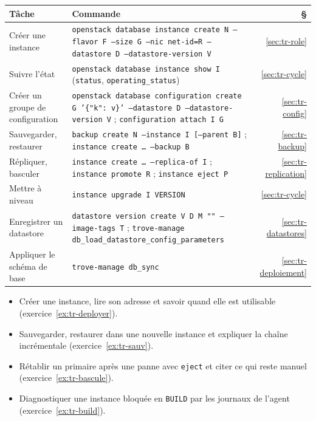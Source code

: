 \begin{center}
\renewcommand{\arraystretch}{1.35}
\begin{tabular}{@{}>{\raggedright\arraybackslash}p{3.8cm}>{\raggedright\arraybackslash}p{10.3cm}r@{}}
\toprule
\textbf{Tâche} & \textbf{Commande} & \textbf{§} \\
\midrule
Créer une instance & \texttt{openstack database instance create N --flavor F --size G --nic net-id=R --datastore D --datastore-version V} & \ref{sec:tr-role} \\
Suivre l'état & \texttt{openstack database instance show I} (\texttt{status}, \texttt{operating\_status}) & \ref{sec:tr-cycle} \\
Créer un groupe de configuration & \texttt{openstack database configuration create G '\{"k": v\}' --datastore D --datastore-version V} ; \texttt{configuration attach I G} & \ref{sec:tr-config} \\
Sauvegarder, restaurer & \texttt{backup create N --instance I [--parent B]} ; \texttt{instance create \dots{} --backup B} & \ref{sec:tr-backup} \\
Répliquer, basculer & \texttt{instance create \dots{} --replica-of I} ; \texttt{instance promote R} ; \texttt{instance eject P} & \ref{sec:tr-replication} \\
Mettre à niveau & \texttt{instance upgrade I VERSION} & \ref{sec:tr-cycle} \\
Enregistrer un datastore & \texttt{datastore version create V D M "" --image-tags T} ; \texttt{trove-manage db\_load\_datastore\_config\_parameters} & \ref{sec:tr-datastores} \\
Appliquer le schéma de base & \texttt{trove-manage db\_sync} & \ref{sec:tr-deploiement} \\
\bottomrule
\end{tabular}
\end{center}

\begin{savoirfaire}
\begin{itemize}
  \item Créer une instance, lire son adresse et savoir quand elle est utilisable (exercice~\ref{ex:tr-deployer}).
  \item Sauvegarder, restaurer dans une nouvelle instance et expliquer la chaîne incrémentale (exercice~\ref{ex:tr-sauv}).
  \item Rétablir un primaire après une panne avec \texttt{eject} et citer ce qui reste manuel (exercice~\ref{ex:tr-bascule}).
  \item Diagnostiquer une instance bloquée en \texttt{BUILD} par les journaux de l'agent (exercice~\ref{ex:tr-build}).
\end{itemize}
\end{savoirfaire}
